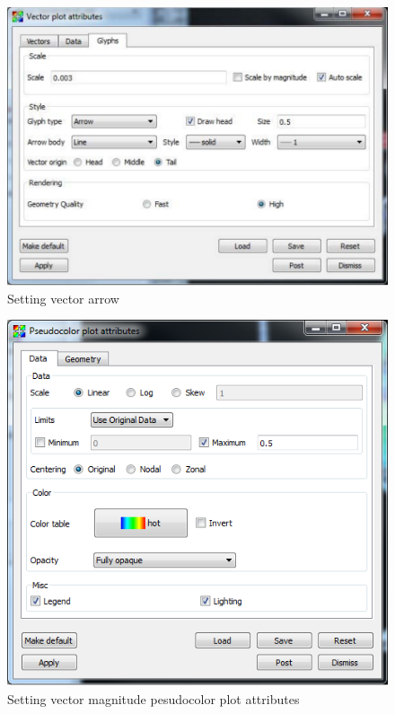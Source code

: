 \documentclass[12pt]{report}
\begin{document}
				 \begin{figure}
        \begin{center}
        \includegraphics{vectorGlyphSet}
        \caption{Setting vector arrow }
        \label{figure:vectorGlyphSet}
        \end{center}
        \end{figure} 
				
					
				 \begin{figure}
        \begin{center}
        \includegraphics{vectorMagColorSet}
        \caption{Setting vector magnitude pesudocolor plot attributes }
        \label{figure:vectorMagColorSet}
        \end{center}
        \end{figure} 
				
\end{document}
